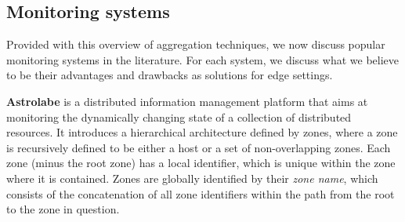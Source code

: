 





\subsection{Monitoring systems}

Provided with this overview of aggregation techniques, we now discuss popular monitoring systems in the literature. For each system, we discuss what we believe to be their advantages and drawbacks as solutions for edge settings.

\textbf{Astrolabe} \cite{Renesse2003} is a distributed information management platform that aims at monitoring the dynamically changing state of a collection of distributed resources. It introduces a hierarchical architecture defined by zones, where a zone is recursively defined to be either a host or a set of non-overlapping zones. Each zone (minus the root zone) has a local identifier, which is unique within the zone where it is contained. Zones are globally identified by their \textit{zone name}, which consists of the concatenation of all zone identifiers within the path from the root to the zone in question.

